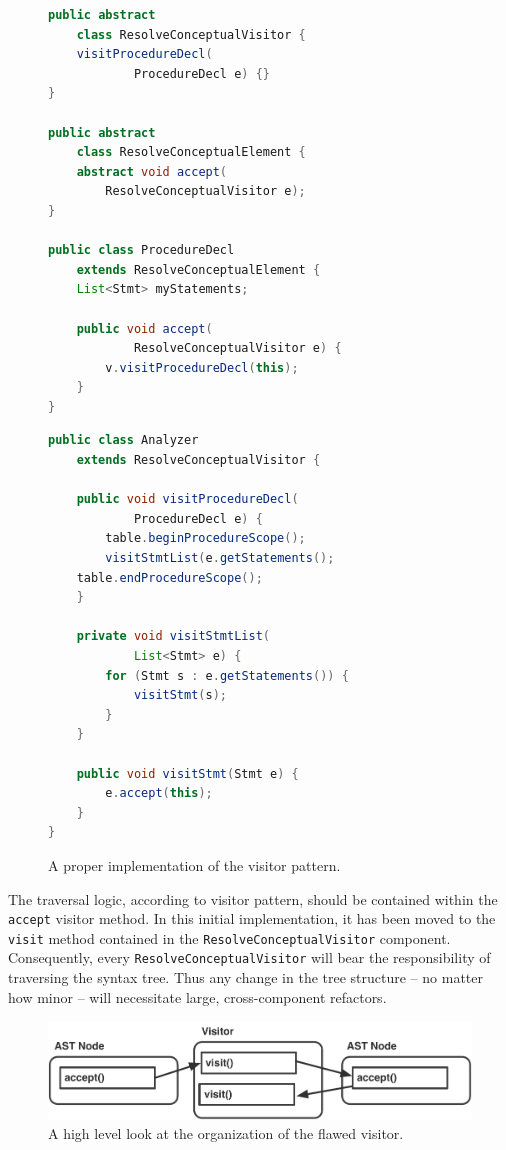 \documentclass[times]{speauth}
\begin{document}
\begin{figure}
\centering
\begin{minipage}{.45\textwidth}
\begin{lstlisting}[language=java]
public abstract
	class ResolveConceptualVisitor {
    visitProcedureDecl(
    		ProcedureDecl e) {}
}

public abstract
	class ResolveConceptualElement {
    abstract void accept(
        ResolveConceptualVisitor e);
}

public class ProcedureDecl
	extends ResolveConceptualElement {	
    List<Stmt> myStatements;

    public void accept(
    		ResolveConceptualVisitor e) {
        v.visitProcedureDecl(this);
    }
}
\end{lstlisting}
\end{minipage}\quad
\begin{minipage}{.45\textwidth}
\begin{lstlisting}[language=java]
public class Analyzer
	extends ResolveConceptualVisitor {
	
    public void visitProcedureDecl(
  			ProcedureDecl e) {
        table.beginProcedureScope();
        visitStmtList(e.getStatements();
	table.endProcedureScope();
    }

    private void visitStmtList(
    		List<Stmt> e) {
        for (Stmt s : e.getStatements()) {
            visitStmt(s);
        }
    }

    public void visitStmt(Stmt e) {
        e.accept(this);
    }
}
\end{lstlisting}
\end{minipage}
\caption{A proper implementation of the visitor pattern.}
\label{fig:flawedvisitorexample}
\end{figure}

The traversal logic, according to visitor pattern, should be contained within the \texttt{accept} visitor method. In this initial implementation, it has been moved to the \texttt{visit} method contained in the \texttt{ResolveConceptualVisitor} component. Consequently, every \texttt{ResolveConceptualVisitor} will bear the responsibility of traversing the syntax tree. Thus any change in the tree structure -- no matter how minor -- will necessitate large, cross-component refactors.

\begin{figure}[!htb]
\centering
\includegraphics[scale=.60]{figures/flawed_visitor_organization.pdf}
\caption{A high level look at the organization of the flawed visitor.}
\label{fig:flawedvisitororganization}
\end{figure}
\end{document}
